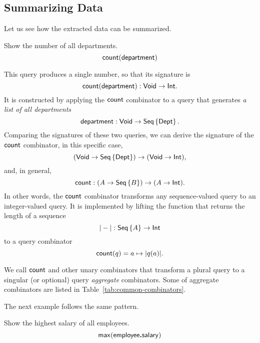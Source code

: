 \subsection*{Summarizing Data}

Let us see how the extracted data can be summarized.

\begin{example}
    \label{ex:count-department}
    Show the number of all departments.
    \begin{equation*}
        \textup{\textsf{count}}(\textup{\textsf{department}})
    \end{equation*}
\end{example}

This query produces a single number, so that its signature is
\begin{equation*}
    \textup{\textsf{count}}(\textup{\textsf{department}}) : \textup{\textsf{Void}} \to \textup{\textsf{Int}}.
\end{equation*}
It is constructed by applying the $\textup{\textsf{count}}$ combinator to a query that generates
\emph{a list of all departments}
\begin{equation*}
    \textup{\textsf{department}} : \textup{\textsf{Void}} \to \textup{\textsf{Seq}}\left\{\textup{\textsf{Dept}}\right\}.
\end{equation*}
Comparing the signatures of these two queries, we can derive the signature of
the $\textup{\textsf{count}}$ combinator, in this specific case,
\begin{equation*}
    (\textup{\textsf{Void}} \to \textup{\textsf{Seq}}\left\{\textup{\textsf{Dept}}\right\}) \to (\textup{\textsf{Void}} \to \textup{\textsf{Int}}),
\end{equation*}
and, in general,
\begin{equation*}
    \textup{\textsf{count}}: (A \to \textup{\textsf{Seq}}\left\{B\right\}) \to (A \to \textup{\textsf{Int}}).
\end{equation*}
In other words, the $\textup{\textsf{count}}$ combinator transforms any sequence-valued query
to an integer-valued query.  It is implemented by lifting the function that
returns the length of a sequence
\begin{equation*}
    |-| : \textup{\textsf{Seq}}\left\{A\right\} \to \textup{\textsf{Int}}
\end{equation*}
to a query combinator
\begin{equation*}
    \textup{\textsf{count}}(q) = a \mapsto |q(a)|.
\end{equation*}

We call $\textup{\textsf{count}}$ and other unary combinators that transform a plural query to a
singular (or optional) query \emph{aggregate} combinators.  Some of aggregate
combinators are listed in Table~\ref{tab:common-combinators}.

The next example follows the same pattern.

\begin{example}
    \label{ex:max-employee-salary}
    Show the highest salary of all employees.
    \begin{equation*}
        \textup{\textsf{max}}(\textup{\textsf{employee}}\boldsymbol{.}\textup{\textsf{salary}})
    \end{equation*}
\end{example}

